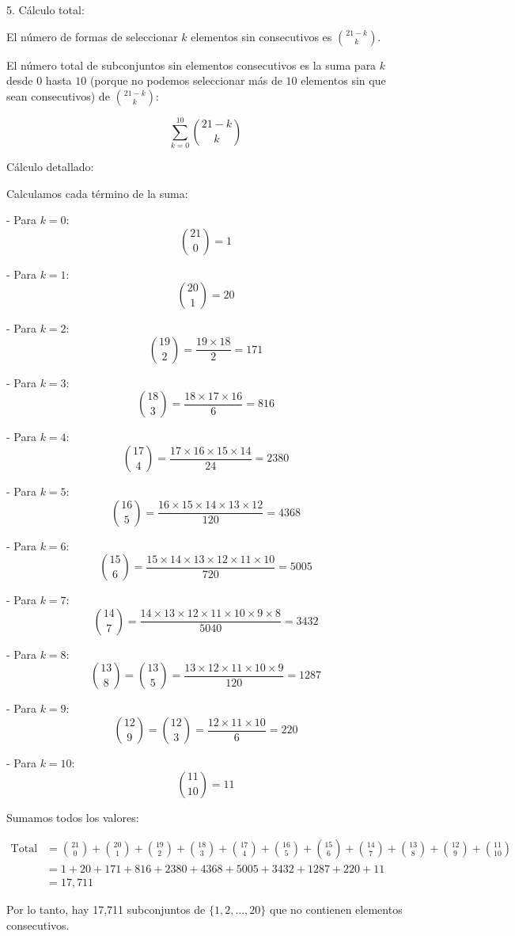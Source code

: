 \documentclass[11pt]{scrartcl}
\begin{document}
\begin{problem}
\begin{hint}
\begin{solu}
5. Cálculo total:

   El número de formas de seleccionar $k$ elementos sin consecutivos es $\binom{21 - k}{k}$.

   El número total de subconjuntos sin elementos consecutivos es la suma para $k$ desde $0$ hasta $10$ (porque no podemos seleccionar más de $10$ elementos sin que sean consecutivos) de $\binom{21 - k}{k}$:

   $$
   \sum_{k=0}^{10} \binom{21 - k}{k}
   $$

Cálculo detallado:

Calculamos cada término de la suma:

- Para $k = 0$:
  $$
  \binom{21}{0} = 1
  $$

- Para $k = 1$:
  $$
  \binom{20}{1} = 20
  $$

- Para $k = 2$:
  $$
  \binom{19}{2} = \frac{19 \times 18}{2} = 171
  $$

- Para $k = 3$:
  $$
  \binom{18}{3} = \frac{18 \times 17 \times 16}{6} = 816
  $$

- Para $k = 4$:
  $$
  \binom{17}{4} = \frac{17 \times 16 \times 15 \times 14}{24} = 2380
  $$

- Para $k = 5$:
  $$
  \binom{16}{5} = \frac{16 \times 15 \times 14 \times 13 \times 12}{120} = 4368
  $$

- Para $k = 6$:
  $$
  \binom{15}{6} = \frac{15 \times 14 \times 13 \times 12 \times 11 \times 10}{720} = 5005
  $$

- Para $k = 7$:
  $$
  \binom{14}{7} = \frac{14 \times 13 \times 12 \times 11 \times 10 \times 9 \times 8}{5040} = 3432
  $$

- Para $k = 8$:
  $$
  \binom{13}{8} = \binom{13}{5} = \frac{13 \times 12 \times 11 \times 10 \times 9}{120} = 1287
  $$

- Para $k = 9$:
  $$
  \binom{12}{9} = \binom{12}{3} = \frac{12 \times 11 \times 10}{6} = 220
  $$

- Para $k = 10$:
  $$
  \binom{11}{10} = 11
  $$

Sumamos todos los valores:

\begin{align*}
\text{Total} &= \binom{21}{0} + \binom{20}{1} + \binom{19}{2} + \binom{18}{3} + \binom{17}{4} + \binom{16}{5} + \binom{15}{6} + \binom{14}{7} + \binom{13}{8} + \binom{12}{9} + \binom{11}{10} \\
&= 1 + 20 + 171 + 816 + 2380 + 4368 + 5005 + 3432 + 1287 + 220 + 11 \\
&= 17,\!711
\end{align*}

Por lo tanto, hay 17,711 subconjuntos de $\{1, 2, \dots, 20\}$ que no contienen elementos consecutivos.
\end{solu}
\end{hint}
\end{problem}
\end{document}
